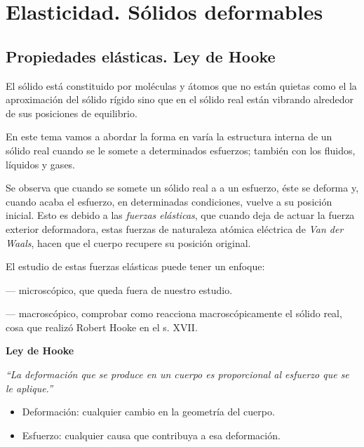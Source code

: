 \chapter{Elasticidad. Sólidos deformables}

\section[Propiedades elásticas. Ley de Hooke]{Propiedades elásticas. Ley de Hooke}

El sólido está constituido por moléculas y átomos que no están quietas como el la aproximación del sólido rígido sino que en el sólido real están vibrando alrededor de sus posiciones de equilibrio.

En este tema vamos a abordar la forma en varía la estructura interna de un sólido real cuando se le somete a determinados esfuerzos; también con los fluidos, líquidos y gases.

\begin{miparrafo}
Se observa que cuando se somete un sólido real a a un esfuerzo, éste se deforma y, cuando acaba el esfuerzo, en determinadas condiciones, vuelve a su posición inicial. Esto es debido a las \emph{fuerzas elásticas}, que cuando deja de actuar la fuerza exterior deformadora, estas fuerzas de naturaleza atómica eléctrica de \emph{Van der Waals}, hacen que el cuerpo recupere su posición original.
\end{miparrafo}
	
El estudio de estas fuerzas elásticas puede tener un enfoque:

--- microscópico, que queda fuera de nuestro estudio.

--- macroscópico, comprobar como reacciona macroscópicamente el sólido real, cosa que realizó Robert Hooke en el s. XVII.


\textbf{Ley de Hooke}

\begin{miparrafodestacado}
\emph{``La deformación que se produce en un cuerpo es proporcional al esfuerzo que se le aplique.''}	
\end{miparrafodestacado}

\begin{itemize}
\item Deformación: cualquier cambio en la geometría del cuerpo.
\item Esfuerzo: cualquier causa	que contribuya a esa deformación.
\end{itemize}

